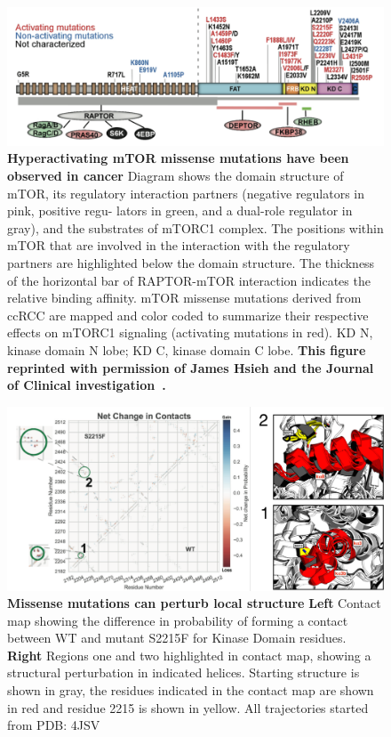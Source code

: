 \documentclass[phd,tocprelim]{cornell}
\begin{document}
\begin{landscape}
	\begin{figure}[p]
		\centering
		\includegraphics[width=1.0\linewidth]{figures/mtor-fig3.png}
		\caption[Hyperactivating mTOR missense mutations have been observed in cancer]{
			{\bf Hyperactivating mTOR missense mutations have been observed in cancer}
			 Diagram shows the domain structure of mTOR, its regulatory interaction partners (negative regulators in pink, positive regu- lators in green, and a dual-role regulator in gray), and the substrates of mTORC1 complex. The positions within mTOR that are involved in the interaction with the regulatory partners are highlighted below the domain structure. The thickness of the horizontal bar of RAPTOR-mTOR interaction indicates the relative binding affinity. mTOR missense mutations derived from ccRCC are mapped and color coded
			to summarize their respective effects on mTORC1 signaling (activating mutations in red). KD N, kinase domain N lobe; KD C, kinase domain C lobe. \bf{This figure reprinted with permission of James Hsieh and the Journal of Clinical investigation~\citep{Xu:2016fw}.}
		}
		\label{fig:mtor-figure3}
	\end{figure}
\end{landscape}

\begin{landscape}
	\begin{figure}[p]
		\centering
		\includegraphics[width=1.0\linewidth]{figures/mtor-fig4.pdf}
		\caption[Missense mutations can perturb local structure]{
		{\bf Missense mutations can perturb local structure}
		 {\bf Left} Contact map showing the difference in probability of forming a contact between WT and mutant S2215F for Kinase Domain residues. {\bf Right} Regions one and two highlighted in contact map, showing a structural perturbation in indicated helices. Starting structure is shown in gray, the residues indicated in the contact map are shown in red and residue 2215 is shown in yellow. All trajectories started from PDB: 4JSV
	}
	\label{fig:mtor-figure4}
\end{figure}
\end{landscape}
\end{document}
